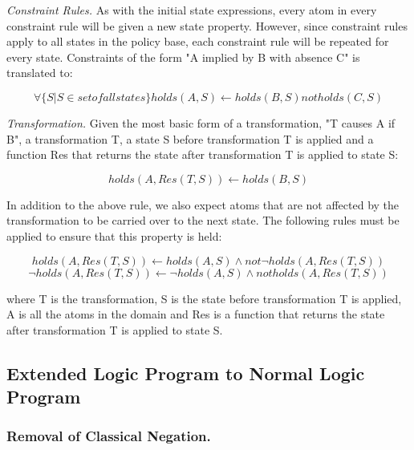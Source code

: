 \documentclass{llncs}
\begin{document}
        \emph{Constraint Rules.} As with the initial state expressions, every
        atom in every constraint rule will be given a new state property.
        However, since constraint rules apply to all states in the policy
        base, each constraint rule will be repeated for every state.
        Constraints of the form "A implied by B with absence C" is translated
        to:

        \begin{equation}
          \forall\{S | S \in set of all states\}
          holds(A, S) \leftarrow holds(B, S) not holds(C, S)
        \end{equation}

        \emph{Transformation.} Given the most basic form of a transformation,
        "T causes A if B", a transformation T, a state S before transformation
        T is applied and a function Res that returns the state after
        transformation T is applied to state S:

        \begin{equation}
          holds(A, Res(T, S)) \leftarrow holds(B, S)
        \end{equation}
 
        In addition to the above rule, we also expect atoms that are not
        affected by the transformation to be carried over to the next state.
        The following rules must be applied to ensure that this property is
        held:

        \begin{equation}
          holds(A, Res(T, S)) \leftarrow holds(A, S) \land not \lnot holds(A, Res(T, S))
        \end{equation}
        \begin{equation}
          \lnot holds(A, Res(T, S)) \leftarrow \lnot holds(A, S) \land not holds(A, Res(T, S))
        \end{equation}

        where T is the transformation, S is the state before transformation
        T is applied, A is all the atoms in the domain and Res is a function
        that returns the state after transformation T is applied to state S.

    \subsection{Extended Logic Program to Normal Logic Program}

      \subsubsection{Removal of Classical Negation.}
\end{document}
